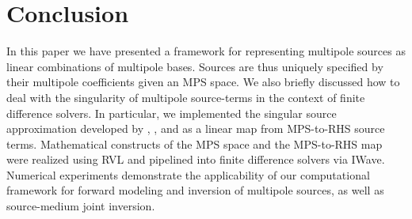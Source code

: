 %

\section{Conclusion}

In this paper we have presented a framework for representing 
multipole sources as linear combinations of multipole bases.
Sources are thus uniquely specified by their multipole coefficients 
given an MPS space.
We also briefly discussed how to deal with the singularity of multipole 
source-terms in the context of finite difference solvers. 
In particular, we implemented the singular source approximation 
developed by \cite{Walden:1999}, \cite{TorEng:04}, and \cite{MPS_theory}
as a linear map from MPS-to-RHS source terms.
Mathematical constructs of the MPS space and the MPS-to-RHS 
map were realized using RVL and pipelined into finite difference solvers via IWave.
Numerical experiments demonstrate the applicability of our computational framework for forward modeling and inversion of multipole sources, as well as source-medium joint inversion.

